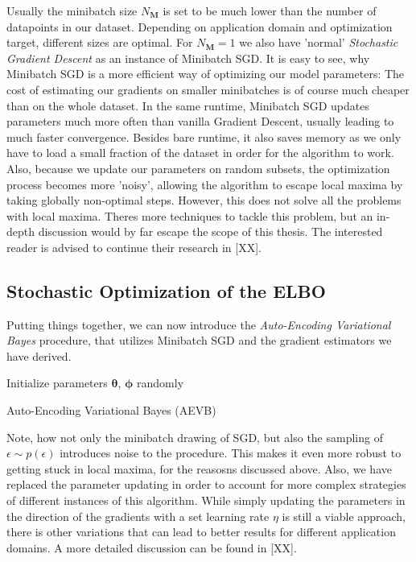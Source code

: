 \documentclass[12pt]{report}
\theoremstyle{definition}
\begin{document}
Usually the minibatch size $N_{\mathbf{M}}$ is set to be much lower than the number of datapoints in our dataset. Depending on application domain and optimization target, different sizes are optimal. For $N_\mathbf{M}=1$ we also have 'normal' \emph{Stochastic Gradient Descent} as an instance of Minibatch SGD. It is easy to see, why Minibatch SGD is a more efficient way of optimizing our model parameters: The cost of estimating our gradients on smaller minibatches is of course much cheaper than on the whole dataset. In the same runtime, Minibatch SGD updates parameters much more often than vanilla Gradient Descent, usually leading to much faster convergence. Besides bare runtime, it also saves memory as we only have to load a small fraction of the dataset in order for the algorithm to work. Also, because we update our parameters on random subsets, the optimization process becomes more 'noisy', allowing the algorithm to escape local maxima by taking globally non-optimal steps. However, this does not solve all the problems with local maxima. Theres more techniques to tackle this problem, but an in-depth discussion would by far escape the scope of this thesis. The interested reader is advised to continue their research in [XX].



\subsection{Stochastic Optimization of the ELBO}
Putting things together, we can now introduce the \emph{Auto-Encoding Variational Bayes} procedure, that utilizes Minibatch SGD and the gradient estimators we have derived.

\begin{algorithm}[H]
\SetAlgoLined
Initialize parameters $\pmb{\theta}$, $\pmb{\phi}$ randomly\\
\caption{Auto-Encoding Variational Bayes (AEVB)}
\end{algorithm}
Note, how not only the minibatch drawing of SGD, but also the sampling of $\epsilon \sim p(\epsilon)$ introduces noise to the procedure. This makes it even more robust to getting stuck in local maxima, for the reasosns discussed above. Also, we have replaced the parameter updating in order to account for more complex strategies of different instances of this algorithm. While simply updating the parameters in the direction of the gradients with a set learning rate $\eta$ is still a viable approach, there is other variations that can lead to better results for different application domains. A more detailed discussion can be found in [XX].
\end{document}
